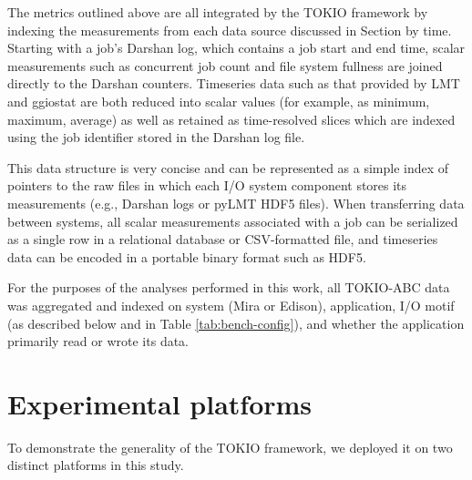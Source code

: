 The metrics outlined above are all integrated by the TOKIO framework by indexing the measurements from each data source discussed in Section \label{sec:methods} by time.
Starting with a job's Darshan log, which contains a job start and end time, scalar measurements such as concurrent job count and file system fullness are joined directly to the Darshan counters.
Timeseries data such as that provided by LMT and ggiostat are both reduced into scalar values (for example, as minimum, maximum, average) as well as retained as time-resolved slices which are indexed using the job identifier stored in the Darshan log file.

This data structure is very concise and can be represented as a simple index of pointers to the raw files in which each I/O system component stores its measurements (e.g., Darshan logs or pyLMT HDF5 files).
When transferring data between systems, all scalar measurements associated with a job can be serialized as a single row in a relational database or CSV-formatted file, and timeseries data can be encoded in a portable binary format such as HDF5.

For the purposes of the analyses performed in this work, all TOKIO-ABC data was aggregated and indexed on system (Mira or Edison), application, I/O motif (as described below and in Table \ref{tab:bench-config}), and whether the application primarily read or wrote its data. 

\section{Experimental platforms} \label{sec:platforms}

To demonstrate the generality of the TOKIO framework, we deployed it on two distinct platforms in this study.

